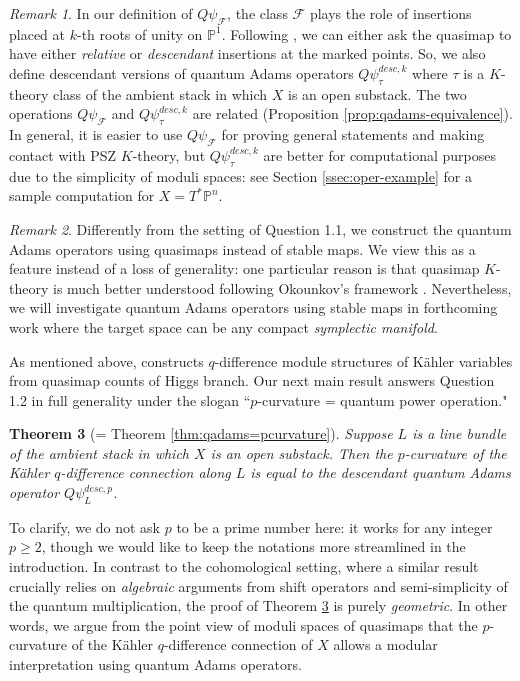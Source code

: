 \documentclass[reqno]{amsart}
\numberwithin{equation}{section}
\numberwithin{equation}{section}
\numberwithin{equation}{section}
\newtheorem{thm}{Theorem}[section]
\theoremstyle{definition}
\theoremstyle{remark}
\theoremstyle{remark}
\newtheorem{rem}[thm]{Remark}
\begin{document}
\begin{rem}
    In our definition of $Q\psi_{\mathcal{F}}$, the class $\mathcal{F}$ plays the role of insertions placed at $k$-th roots of unity on $\mathbb{P}^1$. Following \cite{Oko17}, we can either ask the quasimap to have either \emph{relative} or \emph{descendant} insertions at the marked points. So, we also define descendant versions of quantum Adams operators $Q\psi^{desc,k}_{\tau}$ where $\tau$ is a $K$-theory class of the ambient stack in which $X$ is an open substack. The two operations $Q\psi_{\mathcal{F}}$ and $Q\psi^{desc,k}_{\tau}$ are related (Proposition \ref{prop:qadams-equivalence}). In general, it is easier to use $Q\psi_{\mathcal{F}}$ for proving general statements and making contact with PSZ $K$-theory, but $Q\psi^{desc,k}_{\tau}$ are better for computational purposes due to the simplicity of moduli spaces: see Section \ref{ssec:oper-example} for a sample computation for $X = T^* \mathbb{P}^n$.
\end{rem}

\begin{rem}\label{rem:stable}
    Differently from the setting of Question 1.1, we construct the quantum Adams operators using quasimaps instead of stable maps. We view this as a feature instead of a loss of generality: one particular reason is that quasimap $K$-theory is much better understood following Okounkov's framework \cite{Oko17}. Nevertheless, we will investigate quantum Adams operators using stable maps in forthcoming work where the target space can be any compact \emph{symplectic manifold}.
\end{rem}

As mentioned above, \cite[Section 8]{Oko17} constructs $q$-difference module structures of K\"ahler variables from quasimap counts of Higgs branch. Our next main result answers Question 1.2 in full generality under the slogan ``$p$-curvature = quantum power operation."

\begin{thm}[= Theorem \ref{thm:qadams=pcurvature}]\label{thm:intro-2}
    Suppose $L$ is a line bundle of the ambient stack in which $X$ is an open substack. Then the $p$-curvature of the K\"ahler $q$-difference connection along $L$ is equal to the descendant quantum Adams operator $Q\psi^{desc,p}_L$.
\end{thm}

To clarify, we do not ask $p$ to be a prime number here: it works for any integer $p \geq 2$, though we would like to keep the notations more streamlined in the introduction. In contrast to the cohomological setting, where a similar result crucially relies on \emph{algebraic} arguments from shift operators and semi-simplicity of the quantum multiplication, the proof of Theorem \ref{thm:intro-2} is purely \emph{geometric}. In other words, we argue from the point view of moduli spaces of quasimaps that the $p$-curvature of the K\"ahler $q$-difference connection of $X$ allows a modular interpretation using quantum Adams operators.
\end{document}
